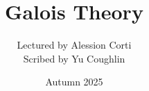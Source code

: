 \documentclass{article}
\begin{document}
\title{Galois Theory}
\author{Lectured by Alession Corti \\
Scribed by Yu Coughlin}
\date{Autumn 2025}

\maketitle

\tableofcontents
\end{document}
